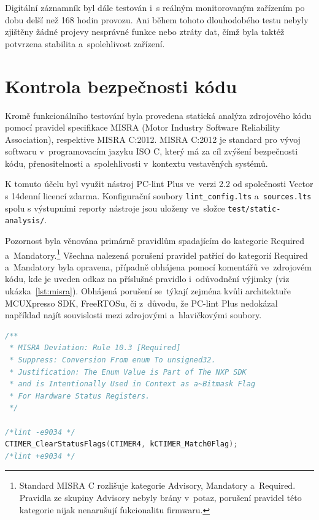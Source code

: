 Digitální záznamník byl dále testován i~s reálným monitorovaným zařízením po dobu delší než 168 hodin provozu. Ani během tohoto dlouhodobého testu nebyly zjištěny žádné projevy nesprávné funkce nebo ztráty dat, čímž byla taktéž potvrzena stabilita a~spolehlivost zařízení.

\section{Kontrola bezpečnosti kódu}
Kromě funkcionálního testování byla provedena statická analýza zdrojového kódu pomocí pravidel specifikace MISRA (Motor Industry Software Reliability Association), respektive MISRA C:2012. MISRA C:2012 je standard pro vývoj softwaru v~programovacím jazyku ISO C, který má za cíl zvýšení bezpečnosti kódu, přenositelnosti a~spolehlivosti v~kontextu vestavěných systémů.

K tomuto účelu byl využit nástroj PC-lint Plus ve~verzi 2.2 od společnosti Vector s 14denní licencí zdarma. Konfigurační soubory \texttt{lint\_config.lts} a~\texttt{sources.lts} spolu s výstupními reporty nástroje jsou uloženy ve~složce \texttt{test/static-analysis/}.

Pozornost byla věnována primárně pravidlům spadajícím do kategorie Required a~Mandatory.\footnote{Standard MISRA C rozlišuje kategorie Advisory, Mandatory a~Required. Pravidla ze skupiny Advisory nebyly brány v~potaz, porušení pravidel této kategorie nijak nenarušují fukcionalitu firmwaru.} Všechna nalezená porušení pravidel patřící do kategorií Required a~Mandatory byla opravena, případně obhájena pomocí komentářů ve~zdrojovém kódu, kde je uveden odkaz na příslušné pravidlo i~odůvodnění výjimky (viz ukázka~\ref{lst:misra}). Obhájená porušení se~týkají zejména kvůli architektuře MCUXpresso SDK, FreeRTOSu, či z~důvodu, že PC-lint Plus nedokázal například najít souvislosti mezi zdrojovými a~hlavičkovými soubory.

\newpage

\begin{lstlisting}[language=C, caption={Ukázka odůvodněného porušení pravidla MISRA}, label={lst:misra}]
/**
 * MISRA Deviation: Rule 10.3 [Required]
 * Suppress: Conversion From enum To unsigned32.
 * Justification: The Enum Value is Part of The NXP SDK
 * and is Intentionally Used in Context as a~Bitmask Flag 
 * For Hardware Status Registers.
 */

/*lint -e9034 */
CTIMER_ClearStatusFlags(CTIMER4, kCTIMER_Match0Flag);
/*lint +e9034 */
\end{lstlisting}

